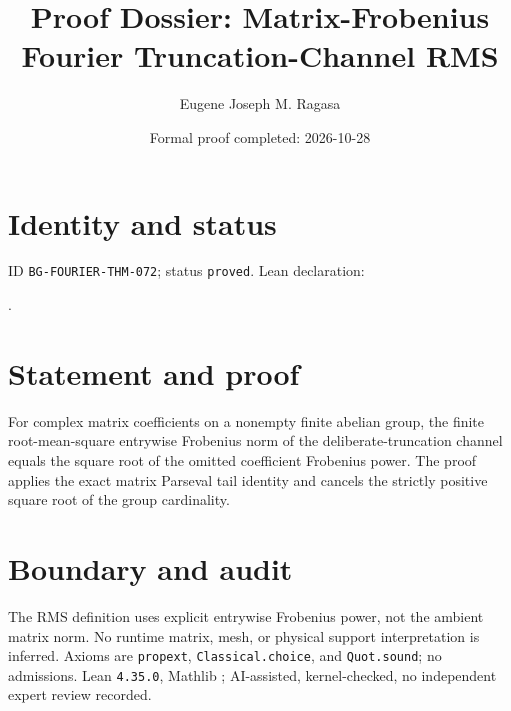 \documentclass[11pt]{article}
\title{Proof Dossier: Matrix-Frobenius Fourier Truncation-Channel RMS}\author{Eugene Joseph M. Ragasa}\date{Formal proof completed: 2026-10-28}
\begin{document}
\raggedright\maketitle
\section{Identity and status}
ID \texttt{BG-FOURIER-THM-072}; status \texttt{proved}. Lean declaration:
\par{}.
\section{Statement and proof}
For complex matrix coefficients on a nonempty finite abelian group, the finite root-mean-square entrywise Frobenius norm of the deliberate-truncation channel equals the square root of the omitted coefficient Frobenius power. The proof applies the exact matrix Parseval tail identity and cancels the strictly positive square root of the group cardinality.
\section{Boundary and audit}
The RMS definition uses explicit entrywise Frobenius power, not the ambient matrix norm. No runtime matrix, mesh, or physical support interpretation is inferred. Axioms are \texttt{propext}, \texttt{Classical.choice}, and \texttt{Quot.sound}; no admissions. Lean \texttt{4.35.0}, Mathlib {\scriptsize{}}; AI-assisted, kernel-checked, no independent expert review recorded.
\end{document}
